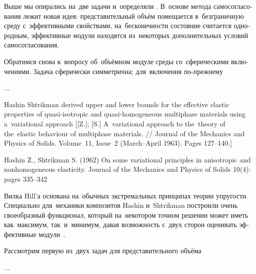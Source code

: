 \label{para:composites.selfconsistentmethod}

\begin{otherlanguage}{russian}

Выше мы опирались на~две задачи   и~определяли   .
В~основе метода самосогласования лежит новая идея: представительный объём помещается в~безграничную среду с~эффективными свойствами, на~бесконечности состояние считается однородным, эффективные модули находятся из~некоторых дополнительных условий самосогласования.

Обратимся снова к~вопросу об~объёмном модуле среды со~сферическими включениями.
Задача сферически симметрична; для~включения по\hbox{-}прежнему

...



\end{otherlanguage}



\label{para:composites.hashin-shtrikman-principle}

{\small
\noindent
Hashin  Shtrikman derived upper and lower bounds for the effective elastic properties of quasi-isotropic and quasi-homogeneous multiphase materials using a~variational approach [[Z.]; [S.] A~variational approach to the~theory of the~elastic behaviour of multiphase materials. // Journal of the Mechanics and Physics of Solids. Volume~11, Issue~2 (March--April 1963). Pages 127\hbox{--}140.]

Hashin Z., Shtrikman S. (1962) On some variational principles in anisotropic and nonhomogeneous elasticity. Journal of the Mechanics and Physics of Solids 10(4): pages 335–342
\par}

\begin{otherlanguage}{russian}

Вилка Hill’а основана на~обычных экстремальных принципах теории упругости.
Специально для~механики композитов Hashin и~Shtrikman построили очень своеобразный функционал, который на~некотором точном решении может иметь как~максимум, так~и~минимум, давая возможность с~двух сторон оценивать эффективные модули~\cite{shermergor}.

Рассмотрим первую из~двух задач для представительного объёма

...



\end{otherlanguage}

